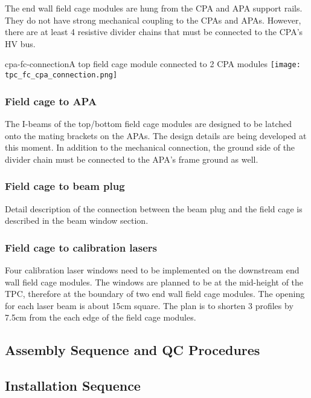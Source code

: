 The end wall field cage modules are hung from the CPA and APA support rails.  They do not have strong mechanical coupling to the CPAs and APAs. However, there are at least 4 resistive divider chains that must be connected to the CPA's HV bus.

\begin{cdrfigure}{cpa-fc-connection}{A top field cage module connected to 2 CPA modules}
\texttt{[image: tpc\_fc\_cpa\_connection.png]}
\end{cdrfigure}


\subsubsection{Field cage to APA}

The I-beams of the top/bottom field cage modules are designed to be latched onto the mating brackets on the APAs.  The design details are being developed at this moment.  In addition to the mechanical connection, the ground side of the divider chain must be connected to the APA's frame ground as well.


\subsubsection{Field cage to beam plug}

Detail description of the connection between the beam plug and the field cage is described in the beam window section.



\subsubsection{Field cage to calibration lasers}

Four calibration laser windows need to be implemented on the downstream end wall field cage modules.  The windows are planned to be at the mid-height of the TPC, therefore at the boundary of two end wall field cage modules.  The opening for each laser beam is about 15cm square.  The plan is to shorten 3 profiles by 7.5cm from the each edge of the field cage modules.



\subsection{Assembly Sequence and QC Procedures}


\subsection{Installation Sequence}



 


